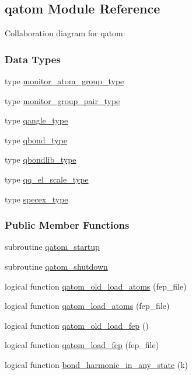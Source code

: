 \hypertarget{classqatom}{\subsection{qatom Module Reference}
\label{classqatom}
}


Collaboration diagram for qatom\-:
\subsubsection*{Data Types}
\begin{DoxyCompactItemize}
\item 
type \hyperlink{structqatom_1_1monitor__atom__group__type}{monitor\-\_\-atom\-\_\-group\-\_\-type}
\item 
type \hyperlink{structqatom_1_1monitor__group__pair__type}{monitor\-\_\-group\-\_\-pair\-\_\-type}
\item 
type \hyperlink{structqatom_1_1qangle__type}{qangle\-\_\-type}
\item 
type \hyperlink{structqatom_1_1qbond__type}{qbond\-\_\-type}
\item 
type \hyperlink{structqatom_1_1qbondlib__type}{qbondlib\-\_\-type}
\item 
type \hyperlink{structqatom_1_1qq__el__scale__type}{qq\-\_\-el\-\_\-scale\-\_\-type}
\item 
type \hyperlink{structqatom_1_1specex__type}{specex\-\_\-type}
\end{DoxyCompactItemize}
\subsubsection*{Public Member Functions}
\begin{DoxyCompactItemize}
\item 
subroutine \hyperlink{classqatom_ad48fcf42edfdf81acc64377a370ad3e7}{qatom\-\_\-startup}
\item 
subroutine \hyperlink{classqatom_acb92aaa41f9f9e05292944bcc695c9e8}{qatom\-\_\-shutdown}
\item 
logical function \hyperlink{classqatom_aa3713b065bf60ea863b49aeaa868bc4f}{qatom\-\_\-old\-\_\-load\-\_\-atoms} (fep\-\_\-file)
\item 
logical function \hyperlink{classqatom_a00e760eda3603bb0bd51f6f84a4e5c9b}{qatom\-\_\-load\-\_\-atoms} (fep\-\_\-file)
\item 
logical function \hyperlink{classqatom_a245143a6153dc19a58f06aba637a9ed0}{qatom\-\_\-old\-\_\-load\-\_\-fep} ()
\item 
logical function \hyperlink{classqatom_abbf41d36e873b10c022ff757a1271b0e}{qatom\-\_\-load\-\_\-fep} (fep\-\_\-file)
\item 
logical function \hyperlink{classqatom_a821169504601d2a8e250c069b14fc1ee}{bond\-\_\-harmonic\-\_\-in\-\_\-any\-\_\-state} (k)
\end{DoxyCompactItemize}
